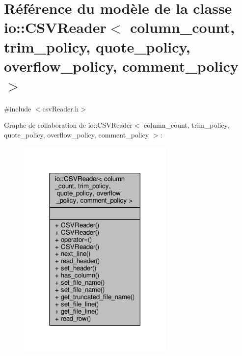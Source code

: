 \hypertarget{classio_1_1CSVReader}{}\section{Référence du modèle de la classe io\+:\+:C\+S\+V\+Reader$<$ column\+\_\+count, trim\+\_\+policy, quote\+\_\+policy, overflow\+\_\+policy, comment\+\_\+policy $>$}
\label{classio_1_1CSVReader}


{\ttfamily \#include $<$csv\+Reader.\+h$>$}



Graphe de collaboration de io\+:\+:C\+S\+V\+Reader$<$ column\+\_\+count, trim\+\_\+policy, quote\+\_\+policy, overflow\+\_\+policy, comment\+\_\+policy $>$\+:\nopagebreak
\begin{figure}[H]
\begin{center}
\leavevmode
\includegraphics[width=218pt]{classio_1_1CSVReader__coll__graph}
\end{center}
\end{figure}
